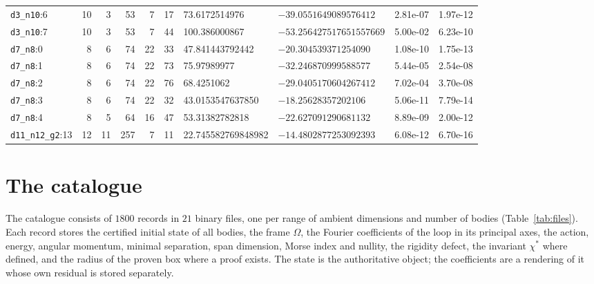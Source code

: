 \documentclass[11pt]{amsart}
\theoremstyle{definition}
\begin{document}
\begin{table}[ht]
\begin{tabular}{@{}lrrrrrllll@{}}
\texttt{d3\_n10}:6 & 10 & 3 & 53 & 7 & 17 & 73.6172514976 & $-39.0551649089576412$ & 2.81e-07 & 1.97e-12\\
\texttt{d3\_n10}:7 & 10 & 3 & 53 & 7 & 44 & 100.386000867 & $-53.256427517651557669$ & 5.00e-02 & 6.23e-10\\
\texttt{d7\_n8}:0 & 8 & 6 & 74 & 22 & 33 & 47.841443792442 & $-20.304539371254090$ & 1.08e-10 & 1.75e-13\\
\texttt{d7\_n8}:1 & 8 & 6 & 74 & 22 & 73 & 75.97989977 & $-32.246870999588577$ & 5.44e-05 & 2.54e-08\\
\texttt{d7\_n8}:2 & 8 & 6 & 74 & 22 & 76 & 68.4251062 & $-29.0405170604267412$ & 7.02e-04 & 3.70e-08\\
\texttt{d7\_n8}:3 & 8 & 6 & 74 & 22 & 32 & 43.0153547637850 & $-18.25628357202106$ & 5.06e-11 & 7.79e-14\\
\texttt{d7\_n8}:4 & 8 & 5 & 64 & 16 & 47 & 53.31382782818 & $-22.627091290681132$ & 8.89e-09 & 2.00e-12\\
\texttt{d11\_n12\_g2}:13 & 12 & 11 & 257 & 7 & 11 & 22.745582769848982 & $-14.4802877253092393$ & 6.08e-12 & 6.70e-16\\
\bottomrule
\end{tabular}
\end{table}

\section{The catalogue}\label{sec:catalogue}

The catalogue consists of $1800$ records in $21$ binary files, one per range of ambient dimensions and number of bodies (Table~\ref{tab:files}). Each record stores the certified initial state of all bodies, the frame $\Omega$, the Fourier coefficients of the loop in its principal axes, the action, energy, angular momentum, minimal separation, span dimension, Morse index and nullity, the rigidity defect, the invariant $\chi^*$ where defined, and the radius of the proven box where a proof exists. The state is the authoritative object; the coefficients are a rendering of it whose own residual is stored separately.
\end{document}
